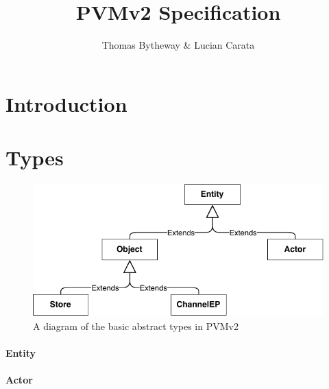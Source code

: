 \documentclass[12pt,twoside,openright,a4paper]{article}
\begin{document}
\title{PVMv2 Specification}
\author{Thomas Bytheway & Lucian Carata}

\begin{minipage}[h]{\textwidth}
    \maketitle
    \vspace{2in}
    {\small}
\end{minipage}

\normalsize



\clearpage

\section{Introduction}

\section{Types}

\begin{figure}[h]
\centering
\includegraphics{pvm_types.pdf}
\caption{A diagram of the basic abstract types in PVMv2}
\end{figure}

\paragraph{Entity}

\paragraph{Actor}
\end{document}
